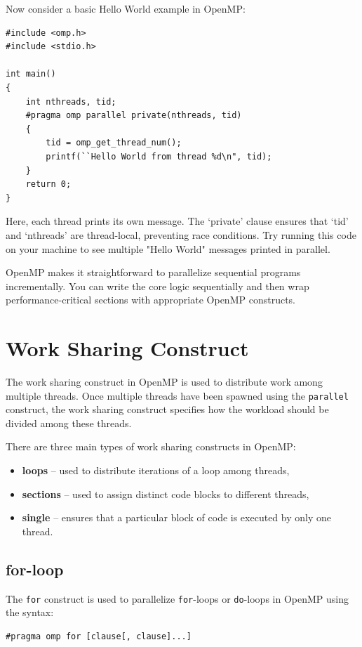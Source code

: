 \documentclass[12pt]{book}
\begin{document}
\vspace{0.5em}
\noindent
Now consider a basic Hello World example in OpenMP:

\begin{lstlisting}[style=cppstyle]
#include <omp.h>
#include <stdio.h>

int main()
{
    int nthreads, tid;
    #pragma omp parallel private(nthreads, tid)
    {
        tid = omp_get_thread_num();
        printf(``Hello World from thread %d\n", tid);
    }
    return 0;
}
\end{lstlisting}

Here, each thread prints its own message. The `private' clause ensures that `tid' and `nthreads' are thread-local, preventing race conditions. Try running this code on your machine to see multiple "Hello World" messages printed in parallel.

\vspace{0.5em}
\noindent
OpenMP makes it straightforward to parallelize sequential programs incrementally. You can write the core logic sequentially and then wrap performance-critical sections with appropriate OpenMP constructs.

\section{Work Sharing Construct}
The work sharing construct in OpenMP is used to distribute work among multiple threads. Once multiple threads have been spawned using the \texttt{parallel} construct, the work sharing construct specifies how the workload should be divided among these threads.

There are three main types of work sharing constructs in OpenMP:
\begin{itemize}
    \item \textbf{loops} – used to distribute iterations of a loop among threads,
    \item \textbf{sections} – used to assign distinct code blocks to different threads,
    \item \textbf{single} – ensures that a particular block of code is executed by only one thread.
\end{itemize}


\subsection{for-loop}

The \texttt{for} construct is used to parallelize \texttt{for}-loops or \texttt{do}-loops in OpenMP using the syntax:
\begin{lstlisting}[style=cppstyle]
#pragma omp for [clause[, clause]...]
\end{lstlisting}
\end{document}
